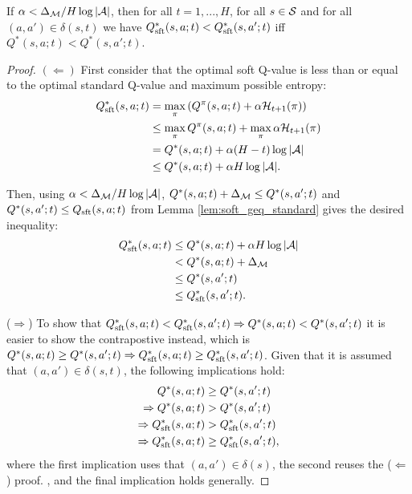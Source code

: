         \begin{lemma} \label{lem:soft_standard_consistent_order}
            If $\alpha < \Delta_{\mathcal{M}} / H\log |\mathcal{A}|$, then for all $t=1,...,H$, for all $s\in\mathcal{S}$ and for all $(a,a')\in\delta(s,t)$ we have $Q_{\textnormal{sft}}^*(s,a;t)<Q_{\textnormal{sft}}^*(s,a';t)$ iff $Q^*(s,a;t) < Q^*(s,a';t)$.
        \end{lemma}
        \begin{proof}
            $(\Leftarrow)$ First consider that the optimal soft Q-value is less than or equal to the optimal standard Q-value and maximum possible entropy:
            \begin{align}
                Q_{\textnormal{sft}}^*(s,a;t) &= \max_\pi \left(Q^{\pi}(s,a;t) + \alpha\mathcal{H}_{t+1}(\pi)\right) \\
                    &\leq \max_\pi Q^{\pi}(s,a;t) + \max_\pi \alpha\mathcal{H}_{t+1}(\pi) \label{appeq:softdiv} \\
                    &= Q^*(s,a;t) + \alpha (H-t)\log |\mathcal{A}| \\
                    &\leq Q^*(s,a;t) + \alpha H\log |\mathcal{A}|.
            \end{align}
            
            Then, using $\alpha < \Delta_{\mathcal{M}} / H\log |\mathcal{A}|$, $Q^*(s,a;t)+\Delta_{\mathcal{M}}\leq Q^*(s,a';t)$ and $Q^*(s,a';t)\leq Q_{{\textnormal{sft}}}(s,a;t)$ from Lemma \ref{lem:soft_geq_standard} gives the desired inequality:
            \begin{align}
                Q_{{\textnormal{sft}}}^*(s,a;t) &\leq Q^*(s,a;t) + \alpha H\log |\mathcal{A}| \\
                    &< Q^*(s,a;t) + \Delta_{\mathcal{M}} \\
                    &\leq Q^*(s,a';t) \\
                    &\leq Q_{{\textnormal{sft}}}^*(s,a';t).
            \end{align}
            
            ($\Rightarrow$) To show that $Q_{{\textnormal{sft}}}^*(s,a;t)<Q_{{\textnormal{sft}}}^*(s,a';t) \Rightarrow Q^*(s,a;t) < Q^*(s,a';t)$ it is easier to show the contrapostive instead, which is $Q^*(s,a;t) \geq Q^*(s,a';t) \Rightarrow Q_{{\textnormal{sft}}}^*(s,a;t)\geq Q_{{\textnormal{sft}}}^*(s,a';t)$. Given that it is assumed that $(a,a')\in\delta(s,t)$, the following implications hold:
            \begin{align}
                Q^*(s,a;t) &\geq Q^*(s,a';t) \\
                \Rightarrow Q^*(s,a;t) &> Q^*(s,a';t) \\
                \Rightarrow Q_{{\textnormal{sft}}}^*(s,a;t) &> Q_{{\textnormal{sft}}}^*(s,a';t) \label{eq:reuse_proof} \\
                \Rightarrow Q_{{\textnormal{sft}}}^*(s,a;t) &\geq Q_{{\textnormal{sft}}}^*(s,a';t),
            \end{align}
            where the first implication uses that $(a,a')\in\delta(s)$, the second reuses the ($\Leftarrow$) proof. , and the final implication holds generally. 
        \end{proof}
    






